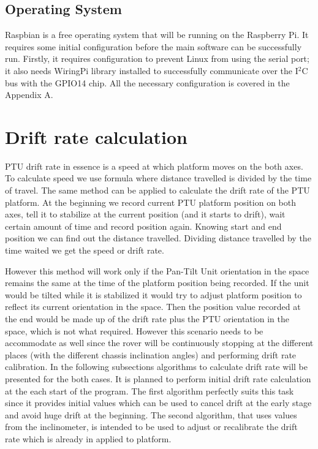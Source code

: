 \subsection{Operating System}
Raspbian is a free operating system that will be running on the Raspberry Pi. It requires some initial configuration before the main software can be successfully run. Firstly, it requires configuration to prevent Linux from using the serial port; it also needs WiringPi library \cite{WiringPi} installed to successfully communicate over the I$^2$C bus with the GPIO14 chip. All the necessary configuration is covered in the Appendix A. 

\section{Drift rate calculation}
PTU drift rate in essence is a speed at which platform moves on the both axes. To calculate speed we use formula where distance travelled is divided by the time of travel. The same method can be applied to calculate the drift rate of the PTU platform. At the beginning we record current PTU platform position on both axes, tell it to stabilize at the current position (and it starts to drift), wait certain amount of time and record position again. Knowing start and end position we can find out the distance travelled. Dividing distance travelled by the time waited we get the speed or drift rate. 

However this method will work only if the Pan-Tilt Unit orientation in the space remains the same at the time of the platform position being recorded. If the unit would be tilted while it is stabilized it would try to adjust platform position to reflect its current orientation in the space. Then the position value recorded at the end would be made up of the drift rate plus the PTU orientation in the space, which is not what required. However this scenario needs to be accommodate as well since the rover will be continuously stopping at the different places (with the different chassis inclination angles) and performing drift rate calibration. In the following subsections algorithms to calculate drift rate will be presented for the both cases. It is planned to perform initial drift rate calculation at the each start of the program. The first algorithm perfectly suits this task since it provides initial values which can be used to cancel drift at the early stage and avoid huge drift at the beginning. The second algorithm, that uses values from the inclinometer, is intended to be used to adjust or recalibrate the drift rate which is already in applied to platform. 

